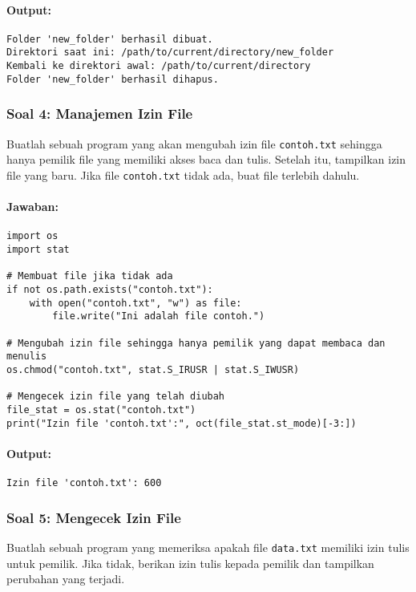 \documentclass[12pt]{article}
\begin{document}
\paragraph{Output:}
\begin{verbatim}
Folder 'new_folder' berhasil dibuat.
Direktori saat ini: /path/to/current/directory/new_folder
Kembali ke direktori awal: /path/to/current/directory
Folder 'new_folder' berhasil dihapus.
\end{verbatim}

\subsubsection{Soal 4: Manajemen Izin File}
Buatlah sebuah program yang akan mengubah izin file \texttt{contoh.txt} sehingga hanya pemilik file yang memiliki akses baca dan tulis. Setelah itu, tampilkan izin file yang baru. Jika file \texttt{contoh.txt} tidak ada, buat file terlebih dahulu.

\paragraph{Jawaban:}
\begin{verbatim}
import os
import stat

# Membuat file jika tidak ada
if not os.path.exists("contoh.txt"):
    with open("contoh.txt", "w") as file:
        file.write("Ini adalah file contoh.")

# Mengubah izin file sehingga hanya pemilik yang dapat membaca dan menulis
os.chmod("contoh.txt", stat.S_IRUSR | stat.S_IWUSR)

# Mengecek izin file yang telah diubah
file_stat = os.stat("contoh.txt")
print("Izin file 'contoh.txt':", oct(file_stat.st_mode)[-3:])
\end{verbatim}

\paragraph{Output:}
\begin{verbatim}
Izin file 'contoh.txt': 600
\end{verbatim}

\subsubsection{Soal 5: Mengecek Izin File}
Buatlah sebuah program yang memeriksa apakah file \texttt{data.txt} memiliki izin tulis untuk pemilik. Jika tidak, berikan izin tulis kepada pemilik dan tampilkan perubahan yang terjadi.
\end{document}
